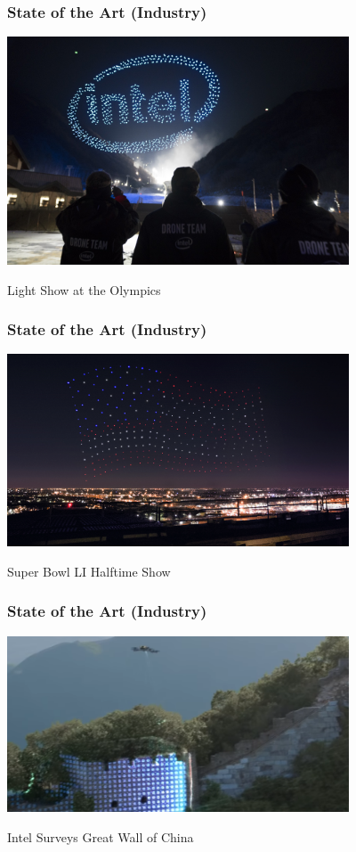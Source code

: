\documentclass{beamer}
\begin{document}
\begin{frame}
\frametitle{State of the Art (Industry)}
\begin{center}
\includegraphics[width=4in]{../src/im/autonomous2}

Light Show at the Olympics
\end{center}
\end{frame}

\begin{frame}
\frametitle{State of the Art (Industry)}
\begin{center}
\includegraphics[width=4in]{../src/im/autonomous3}

Super Bowl LI Halftime Show
\end{center}
\end{frame}

\begin{frame}
\frametitle{State of the Art (Industry)}
\begin{center}
\includegraphics[width=4in]{../src/im/great_wall1}

Intel Surveys Great Wall of China
\end{center}
\end{frame}
\end{document}

